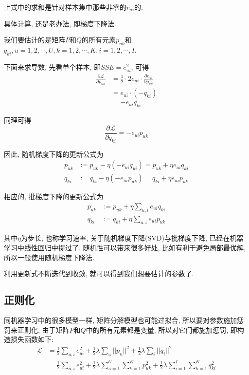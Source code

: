 \documentclass[a4paper,UTF8]{ctexart}
\theoremstyle{plain} \newtheorem{theorem}{定理}[section]
\theoremstyle{plain} \newtheorem{definition}{定义}[section]
\theoremstyle{plain} \newtheorem{lemma}{引理}[section]
\theoremstyle{plain} \newtheorem{proposition}{命题}[section]
\theoremstyle{plain} \newtheorem{example}{例}[section]
\theoremstyle{plain} \newtheorem{remark}{注}[section]
\theoremstyle{plain} \newtheorem{corollary}{推论}[section]
\newcommand{\p}[3]{\frac{\partial^{#1}#2}{\partial{#3}^{#1}}}  %
\begin{document}
上式中的求和是针对样本集中那些非零的$r_{ui}$的.

具体计算, 还是老办法, 即梯度下降法.

我们要估计的是矩阵$P$和$Q$的所有元素$p_{uk}$和$q_{ki}, u = 1,2,\cdots,U, k = 1,2,\cdots,K, i = 1,2,\cdots,I$.

下面来求导数, 先看单个样本, 即$SSE = e_{ui}^2$, 可得
\begin{align*}
\p{}{\mathcal{L}}{p_{uk}} & = \frac{1}{2} \cdot 2 e_{ui} \cdot \p{}{e_{ui}}{p_{uk}} \\ 
& = e_{ui} \cdot (- q_{ki}) \\ 
& = - e_{ui} q_{ki}
\end{align*}

同理可得
\begin{equation*}
\p{}{\mathcal{L}}{q_{ki}} = - e_{ui} p_{uk} 
\end{equation*}

因此, 随机梯度下降的更新公式为
\begin{align*}
p_{uk} & := p_{uk} - \eta (- e_{ui} q_{ui}) = p_{uk} + \eta e_{ui} q_{ki} \\ 
q_{ki} & := q_{ki} - \eta (- e_{ui} p_{uk}) = q_{ki} + \eta e_{ui} p_{uk}
\end{align*}

相应的, 批梯度下降的更新公式为
\begin{align*}
p_{uk} & := p_{uk} + \eta \sum_{u,i} e_{ui} q_{ki} \\ 
q_{ki} & := q_{ki} + \eta \sum_{u,i} e_{ui} p_{uk}
\end{align*}

其中$\eta$为步长, 也称学习速率, 关于随机梯度下降(SVD)与批梯度下降, 已经在机器学习中线性回归中提过了. 随机性可以带来很多好处, 比如有利于避免局部最优解, 所以一般使用随机梯度下降法.

利用更新式不断迭代到收敛, 就可以得到我们想要估计的参数了.


\subsection{正则化}
同机器学习中的很多模型一样, 矩阵分解模型也可能过拟合, 所以要对参数施加惩罚来正则化, 由于矩阵$P$和$Q$中的所有元素都是变量, 所以对它们都施加惩罚, 即构造损失函数如下:
\begin{align*}
\mathcal{L} & = \frac{1}{2} \sum_{u,i} e_{ui}^2 + \frac{1}{2} \lambda \sum_{u} ||p_{u}||^2 + \frac{1}{2} \lambda \sum_{i} ||q_{i}||^2 \\ 
& = \frac{1}{2} \sum_{u,i} e_{ui}^2 + \frac{1}{2} \lambda \sum_{u=1}^{U} \sum_{k=1}^{K} p_{uk}^2 + \frac{1}{2} \lambda \sum_{i=1}^{I} \sum_{k=1}^{K} q_{ki}^2
\end{align*}
\end{document}
